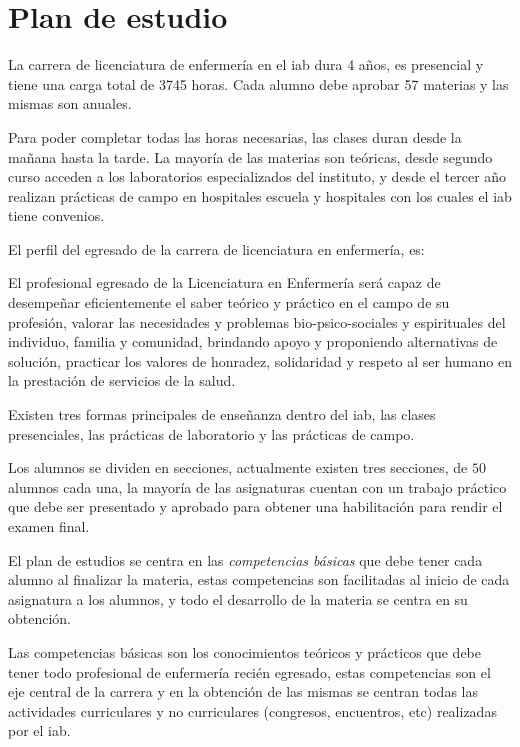 \section{Plan de estudio}
\label{sec:plan_estudio}

La carrera de licenciatura de enfermería en el \Gls{iab} dura 4 años, es
presencial y tiene una carga total de 3745 horas. Cada alumno debe aprobar 57
materias y las mismas son anuales.

Para poder completar todas las horas necesarias, las clases duran desde la
mañana hasta la tarde. La mayoría de las materias son teóricas, desde segundo
curso acceden a los laboratorios especializados del instituto, y desde el tercer
año realizan prácticas de campo en hospitales escuela y hospitales con los
cuales el \Gls{iab} tiene convenios.

El perfil del egresado de la carrera de licenciatura en enfermería,
es\cite{iab:enfermeria}:

\begin{displayquote}

El profesional egresado de la Licenciatura en Enfermería será capaz de
desempeñar eficientemente el saber teórico y práctico en el campo de su
profesión, valorar las necesidades y problemas bio-psico-sociales y espirituales
del individuo, familia y comunidad, brindando apoyo y proponiendo alternativas
de solución, practicar los valores de honradez, solidaridad y respeto al ser
humano en la prestación de servicios de la salud.

\end{displayquote}

Existen tres formas principales de enseñanza dentro del \Gls{iab}, las clases
presenciales, las prácticas de laboratorio y las prácticas de campo.

Los alumnos se dividen en secciones, actualmente existen tres secciones, de $50$
alumnos cada una, la mayoría de las asignaturas cuentan con un trabajo práctico
que debe ser presentado y aprobado para obtener una habilitación para rendir el
examen final.

El plan de estudios se centra en las \emph{competencias básicas} que debe tener
cada alumno al finalizar la materia, estas competencias son facilitadas al
inicio de cada asignatura a los alumnos, y todo el desarrollo de la materia se
centra en su obtención.

Las competencias básicas son los conocimientos teóricos y prácticos que debe
tener todo profesional de enfermería recién egresado, estas competencias son el
eje central de la carrera y en la obtención de las mismas se centran todas las
actividades curriculares y no curriculares (congresos, encuentros, etc)
realizadas por el \Gls{iab}.
